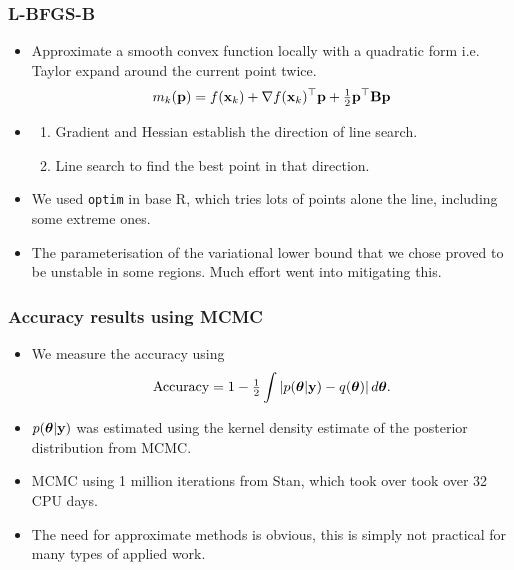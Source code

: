 \documentclass{beamer}
\begin{document}
\begin{frame}
	\frametitle{L-BFGS-B}
	\begin{itemize}
		\item Approximate a smooth convex function locally with a quadratic form i.e. Taylor expand around the current point twice.
		      \[
		      	m_k({\bf p}) = f({\bf x}_k) + \nabla f({\bf x}_k)^\top {\bf p} + \tfrac{1}{2} {\bf p}^\top {\bf B} {\bf p}
		      \]
		\item \begin{enumerate}
		\item Gradient and Hessian establish the direction of line search.
		\item Line search to find the best point in that direction.
		\end{enumerate}
		\item We used \texttt{optim} in base R, which tries lots of points alone the line, including some extreme 
		      ones.
		\item The parameterisation of the variational lower bound that we chose proved to be unstable in some 
		      regions. Much effort went into mitigating this.
	\end{itemize}
\end{frame}

\begin{frame}
	\frametitle{Accuracy results using MCMC}
	\begin{itemize}
		\item	We measure the accuracy using
		      $$\text{Accuracy} = 1 - \tfrac{1}{2} \int \left |p({\boldsymbol \theta}|{\bf y}) - q({\boldsymbol \theta}) \right | d {\boldsymbol \theta}.$$
		\item	$p({\boldsymbol \theta}|{\bf y})$ was estimated using the kernel density estimate of the posterior
		      distribution from MCMC.
		\item MCMC using 1 million iterations from Stan, which took over took over 32 CPU days.
		\item The need for approximate methods is obvious, this is simply not
		      practical for many types of applied work.
	\end{itemize}
\end{frame}
\end{document}
